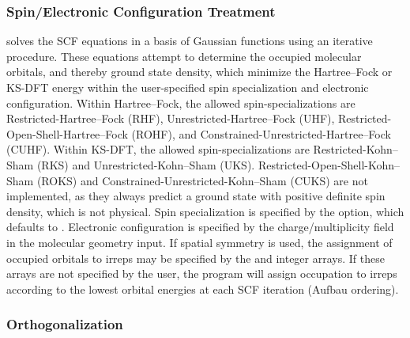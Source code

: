 \subsubsection{Spin/Electronic Configuration Treatment}

\PSIfour solves the SCF equations in a basis of Gaussian functions using an
iterative procedure. These equations attempt to determine the occupied molecular
orbitals, and thereby ground state density, which minimize the Hartree--Fock or
KS-DFT energy within the user-specified spin specialization and electronic
configuration. Within Hartree--Fock, the allowed spin-specializations are
Restricted-Hartree--Fock (RHF), Unrestricted-Hartree--Fock (UHF),
Restricted-Open-Shell-Hartree--Fock (ROHF), and
Constrained-Unrestricted-Hartree--Fock (CUHF). Within KS-DFT, the allowed
spin-specializations are Restricted-Kohn--Sham (RKS) and Unrestricted-Kohn--Sham
(UKS). Restricted-Open-Shell-Kohn--Sham (ROKS) and
Constrained-Unrestricted-Kohn--Sham (CUKS) are not implemented, as they always
predict a ground state with positive definite spin density, which is not
physical. Spin specialization is specified by the  option,
which defaults to .  Electronic configuration is specified by the
charge/multiplicity field in the molecular geometry input.  If spatial symmetry
is used, the assignment of occupied orbitals to irreps may be specified by the
 and  integer arrays. If these arrays are not
specified by the user, the program will assign occupation to irreps according to
the lowest orbital energies at each SCF iteration (Aufbau ordering).  

\subsubsection{Orthogonalization}

